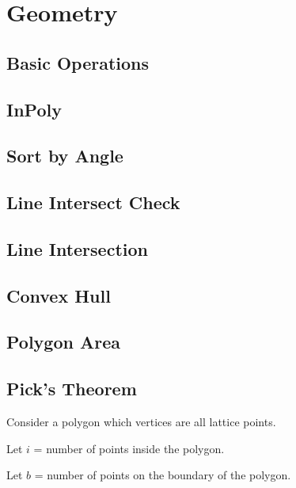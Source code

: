 \documentclass[a4paper,10pt,twocolumn,oneside]{article}
\begin{document}
\section{Geometry}

\subsection{Basic Operations}


\subsection{InPoly}


\subsection{Sort by Angle}


\subsection{Line Intersect Check}


\subsection{Line Intersection}


\subsection{Convex Hull}


\subsection{Polygon Area}


\subsection{Pick's Theorem}
Consider a polygon which vertices are all lattice points.

Let $i$ = number of points inside the polygon.

Let $b$ = number of points on the boundary of the polygon.
\end{document}
